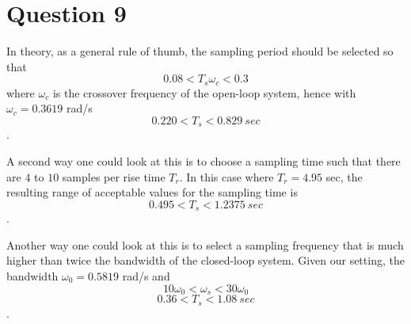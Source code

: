 \section{Question 9}

In theory\cite{levine}, as a general rule of thumb, the sampling period should
be selected so that $$0.08 < T_s \omega_c < 0.3$$ where $\omega_c$ is the
crossover frequency of the open-loop system, hence with $\omega_c = 0.3619$
rad/s $$0.220 < T_s < 0.829\ sec$$.

A second way one could look at this is to choose a sampling time such that there
are $4$ to $10$ samples per rise time $T_r$. In this case where $T_r=4.95$ sec,
the resulting range of acceptable values for the sampling time is
$$0.495 < T_s < 1.2375\ sec$$.

Another way one could look at this is to select a sampling frequency that is
much higher than twice the bandwidth of the closed-loop system. Given our
setting, the bandwidth $\omega_0 = 0.5819$ rad/s and
$$10\omega_0 < \omega_s < 30\omega_0$$
$$0.36 < T_s < 1.08\ sec$$.
